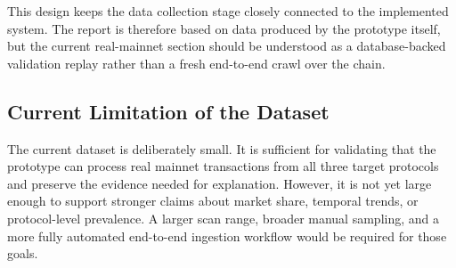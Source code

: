 This design keeps the data collection stage closely connected to the implemented system. The report is therefore based on data produced by the prototype itself, but the current real-mainnet section should be understood as a database-backed validation replay rather than a fresh end-to-end crawl over the chain.

\subsection{Current Limitation of the Dataset}

The current dataset is deliberately small. It is sufficient for validating that the prototype can process real mainnet transactions from all three target protocols and preserve the evidence needed for explanation. However, it is not yet large enough to support stronger claims about market share, temporal trends, or protocol-level prevalence. A larger scan range, broader manual sampling, and a more fully automated end-to-end ingestion workflow would be required for those goals.
